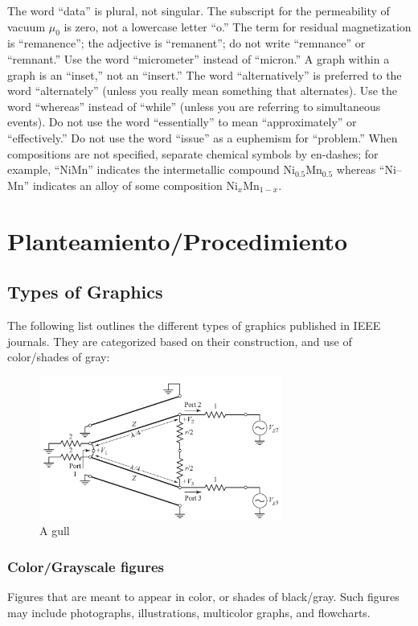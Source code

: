 \documentclass[a4paper]{IEEEtran} %
\begin{document}
The word ``data'' is plural, not singular. The subscript for the 
permeability of vacuum $\mu _{0}$ is zero, not a lowercase letter 
``o.'' The term for residual magnetization is ``remanence''; the adjective 
is ``remanent''; do not write ``remnance'' or ``remnant.'' Use the word 
``micrometer'' instead of ``micron.'' A graph within a graph is an 
``inset,'' not an ``insert.'' The word ``alternatively'' is preferred to the 
word ``alternately'' (unless you really mean something that alternates). Use 
the word ``whereas'' instead of ``while'' (unless you are referring to 
simultaneous events). Do not use the word ``essentially'' to mean 
``approximately'' or ``effectively.'' Do not use the word ``issue'' as a 
euphemism for ``problem.'' When compositions are not specified, separate 
chemical symbols by en-dashes; for example, ``NiMn'' indicates the 
intermetallic compound Ni$_{0.5}$Mn$_{0.5}$ whereas 
``Ni--Mn'' indicates an alloy of some composition 
Ni$_{x}$Mn$_{1-x}$.

\section{Planteamiento/Procedimiento}
\label{sec:guidelines}

\subsection{Types of Graphics}
The following list outlines the different types of graphics published in 
IEEE journals. They are categorized based on their construction, and use of 
color/shades of gray:

\begin{figure}
    \centering
        \includegraphics[width=8cm]{imagenes/img3}
        \caption{A gull}
        \label{fig:gull}
\end{figure}

\subsubsection{Color/Grayscale figures}
{Figures that are meant to appear in color, or shades of black/gray. Such 
figures may include photographs, illustrations, multicolor graphs, and 
flowcharts.}
\end{document}
